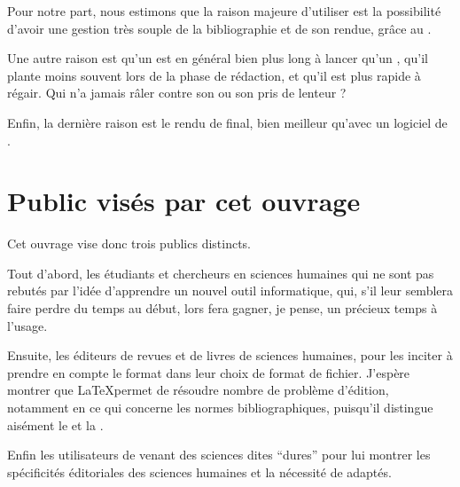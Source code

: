 Pour notre part, nous estimons que la raison majeure d'utiliser  est la possibilité d'avoir une gestion très souple de la bibliographie et de son rendue, grâce au  . 

Une autre raison est qu'un  est en général bien plus long à lancer qu'un , qu'il plante moins souvent lors de la phase de rédaction, et qu'il est plus rapide à régair. Qui n'a jamais râler contre son  ou son  pris de lenteur ?

Enfin, la dernière raison est le rendu de \logiciel{\LaTeX}  final, bien meilleur qu'avec un logiciel de .


\section{Public visés par cet ouvrage}

Cet ouvrage vise donc trois publics distincts.

Tout d'abord, les étudiants et chercheurs en sciences humaines qui ne sont pas rebutés par l'idée d'apprendre un nouvel outil informatique, qui, s'il leur semblera faire perdre du temps au début, lors fera gagner, je pense, un précieux temps à l'usage.

Ensuite, les éditeurs de revues et de livres de sciences humaines, pour les inciter à prendre en compte le format \concept{\LaTeX} dans leur choix de format de fichier. J'espère montrer que \LaTeX permet de résoudre nombre de problème d'édition, notamment en ce qui concerne les normes bibliographiques, puisqu'il distingue aisément le  et la .

Enfin les utilisateurs de \logiciel{\LaTeX} venant des sciences dites \enquote{dures} pour lui montrer les spécificités éditoriales des sciences humaines et la nécessité de  adaptés.

